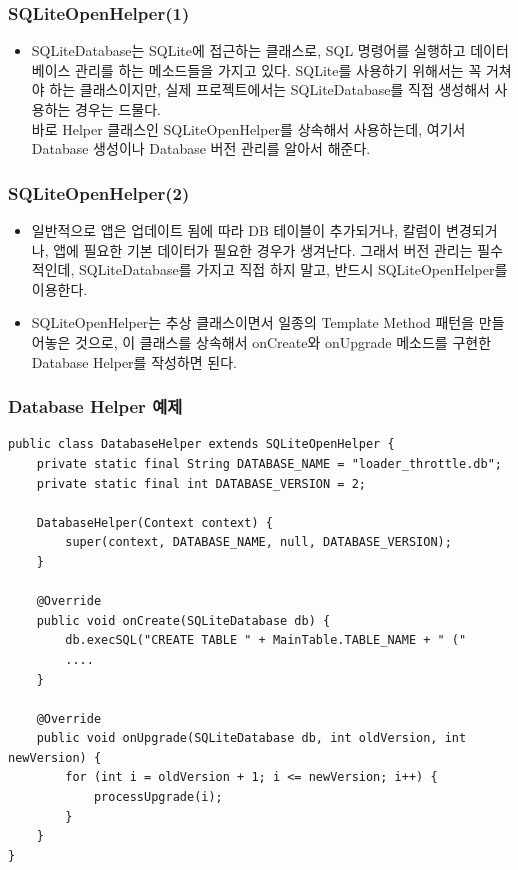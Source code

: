 \documentclass{beamer}
\newcommand\Fontvi{\fontsize{8}{9.6}\selectfont}
\begin{document}
\begin{frame}
\frametitle{SQLiteOpenHelper(1)}
\begin{itemize}
\item SQLiteDatabase는 SQLite에 접근하는 클래스로, SQL 명령어를 실행하고 데이터베이스 관리를 하는 메소드들을 가지고 있다. SQLite를 사용하기 위해서는 꼭 거쳐야 하는 클래스이지만, 실제 프로젝트에서는 SQLiteDatabase를 직접 생성해서 사용하는 경우는 드물다.\\
바로 Helper 클래스인 SQLiteOpenHelper를 상속해서 사용하는데, 여기서 Database 생성이나 Database 버전 관리를 알아서 해준다.
\end{itemize}
\end{frame}

\begin{frame}
\frametitle{SQLiteOpenHelper(2)}
\begin{itemize}
\item 일반적으로 앱은 업데이트 됨에 따라 DB 테이블이 추가되거나, 칼럼이 변경되거나, 앱에 필요한 기본 데이터가 필요한 경우가 생겨난다. 그래서 버전 관리는 필수적인데, SQLiteDatabase를 가지고 직접 하지 말고, 반드시 SQLiteOpenHelper를 이용한다.
\item SQLiteOpenHelper는 추상 클래스이면서 일종의 Template Method 패턴을 만들어놓은 것으로, 이 클래스를 상속해서 onCreate와 onUpgrade 메소드를 구현한 Database Helper를 작성하면 된다.
\end{itemize}
\end{frame}

\begin{frame}[fragile]
\frametitle{Database Helper 예제}
\Fontvi
\begin{verbatim}
public class DatabaseHelper extends SQLiteOpenHelper {
    private static final String DATABASE_NAME = "loader_throttle.db";
    private static final int DATABASE_VERSION = 2;

    DatabaseHelper(Context context) {
        super(context, DATABASE_NAME, null, DATABASE_VERSION);
    }

    @Override
    public void onCreate(SQLiteDatabase db) {
        db.execSQL("CREATE TABLE " + MainTable.TABLE_NAME + " ("
        ....
    }

    @Override
    public void onUpgrade(SQLiteDatabase db, int oldVersion, int newVersion) {
        for (int i = oldVersion + 1; i <= newVersion; i++) {
            processUpgrade(i);
        }
    }
}
\end{verbatim}
\end{frame}
\end{document}
